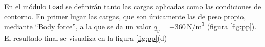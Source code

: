 \documentclass[spanish,a4paper,12pt]{article}
\begin{document}
En el módulo \texttt{Load} se definirán tanto las cargas aplicadas como las condiciones de contorno. 
En primer lugar las cargas, que son únicamente las de peso propio, mediante ``Body force'', a la que se da un valor $q_{y}=-360\,\text{N/m}^{3}$ (figura \ref{fig:pp}).
El resultado final se visualiza en la figura \ref{fig:pp}(d)
\begin{figure}[h!tp]
\centering
{}

\end{figure}
\end{document}

